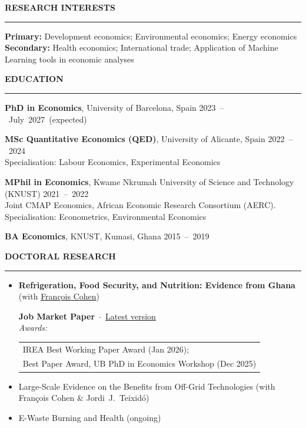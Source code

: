 \documentclass{resume} %
\def\sectionskip{\vspace{4pt}}
\def\sectionlineskip{\smallskip}
\renewenvironment{rSection}[1]{%
  \sectionskip
  \MakeUppercase{{\bf #1}}%
  \sectionlineskip
  \hrule
  \begin{list}{}{\setlength{\leftmargin}{0em}\setlength{\topsep}{5pt}\setlength{\itemsep}{0pt}\setlength{\parsep}{0pt}}%
  \item[]
}{%
  \end{list}
}
\newcommand{\when}[1]{\hfill\mbox{#1}}
\begin{document}
\begin{rSection}{Research Interests}
\textbf{Primary:} Development economics; Environmental economics; Energy economics\\
\textbf{Secondary:} Health economics; International trade; Application of Machine Learning tools in economic analyses
\end{rSection}


\begin{rSection}{Education}
\textbf{PhD in Economics}, University of Barcelona, Spain \when{2023 -- July 2027 (expected)}

\textbf{MSc Quantitative Economics (QED)}, University of Alicante, Spain \when{2022 -- 2024}\\
{\small Specialisation: Labour Economics, Experimental Economics}

\textbf{MPhil in Economics}, Kwame Nkrumah University of Science and Technology (KNUST) \when{2021 -- 2022}\\
{\small Joint CMAP Economics, African Economic Research Consortium (AERC). \\ Specialisation: Econometrics, Environmental Economics}

\textbf{BA Economics}, KNUST, Kumasi, Ghana \when{2015 -- 2019}
\end{rSection}


\begin{rSection}{Doctoral Research}
\raggedright
\begin{itemize}
\item \textbf{Refrigeration, Food Security, and Nutrition: Evidence from Ghana} (with \href{https://sites.google.com/site/francoiscoheneconomist/home}{François Cohen})\\
{\small \textbf{Job Market Paper} \,$\cdot$\, \href{https://ntsifulenoch.github.io/files/Ntsiful_JMP.pdf}{Latest version}\\
\textit{Awards:} \begin{tabular}[t]{@{}l@{}}IREA Best Working Paper Award (Jan 2026);\\ Best Paper Award, UB PhD in Economics Workshop (Dec 2025)\end{tabular}}
\item Large-Scale Evidence on the Benefits from Off-Grid Technologies (with François Cohen \& Jordi~J.~Teixidó)
\item E-Waste Burning and Health (ongoing)
\end{itemize}
\end{rSection}
\end{document}
